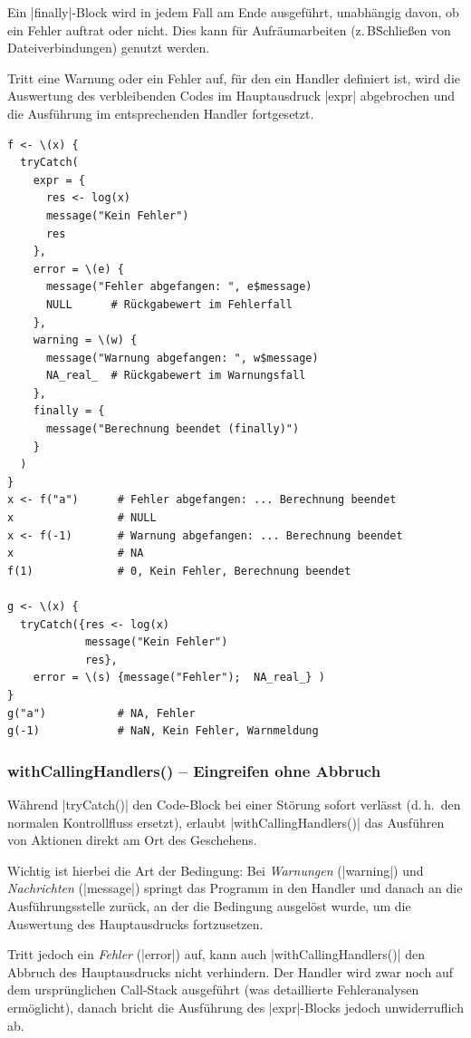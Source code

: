 \documentclass[10pt,twocolumn]{scrartcl}
\renewcommand{\lstinline}{\mycoloredinline}
\begin{document}
Ein \lstinline|finally|-Block wird in jedem Fall am Ende ausgeführt, unabhängig davon, ob ein Fehler auftrat oder nicht. Dies kann für Aufräumarbeiten (z.\,B\. Schließen von Dateiverbindungen) genutzt werden.

Tritt eine Warnung oder ein Fehler auf, für den ein Handler definiert ist, wird die Auswertung des verbleibenden Codes im Hauptausdruck \lstinline|expr| abgebrochen und die Ausführung im entsprechenden Handler fortgesetzt.

\begin{lstlisting}
f <- \(x) {
  tryCatch(
    expr = {
      res <- log(x)
      message("Kein Fehler")
      res
    },
    error = \(e) {
      message("Fehler abgefangen: ", e$message)
      NULL      # Rückgabewert im Fehlerfall
    },
    warning = \(w) {
      message("Warnung abgefangen: ", w$message)
      NA_real_  # Rückgabewert im Warnungsfall
    },
    finally = {
      message("Berechnung beendet (finally)")
    }
  )
}
x <- f("a")      # Fehler abgefangen: ... Berechnung beendet
x                # NULL
x <- f(-1)       # Warnung abgefangen: ... Berechnung beendet
x                # NA
f(1)             # 0, Kein Fehler, Berechnung beendet

g <- \(x) {
  tryCatch({res <- log(x)
            message("Kein Fehler")
            res},
    error = \(s) {message("Fehler");  NA_real_} )
}
g("a")           # NA, Fehler
g(-1)            # NaN, Kein Fehler, Warnmeldung
\end{lstlisting}


\subsubsection{withCallingHandlers() -- Eingreifen ohne Abbruch}

Während \lstinline|tryCatch()| den Code-Block bei einer Störung sofort verlässt (d.\,h.\ den normalen Kontrollfluss ersetzt), erlaubt \lstinline|withCallingHandlers()| das Ausführen von Aktionen direkt am Ort des Geschehens. 

Wichtig ist hierbei die Art der Bedingung: Bei \emph{Warnungen} (\lstinline|warning|) und \emph{Nachrichten} (\lstinline|message|) springt das Programm in den Handler und danach an die Ausführungsstelle zurück, an der die Bedingung ausgelöst wurde, um die Auswertung des Hauptausdrucks fortzusetzen.

Tritt jedoch ein \emph{Fehler} (\lstinline|error|) auf, kann auch \lstinline|withCallingHandlers()| den Abbruch des Hauptausdrucks nicht verhindern. Der Handler wird zwar noch auf dem ursprünglichen Call-Stack ausgeführt (was detaillierte Fehleranalysen ermöglicht), danach bricht die Ausführung des \lstinline|expr|-Blocks jedoch unwiderruflich ab.
\end{document}
